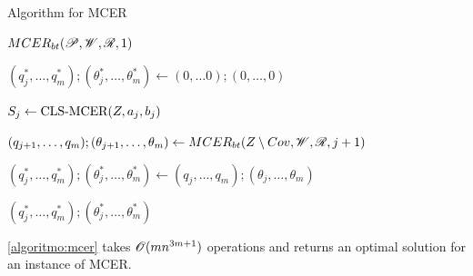\begin{algoritmo}
	\caption{Algorithm for MCER}\label{algoritmo:mcer}
	\begin{algorithmic}[1]
		
		
		\item[]
		\State \Return $MCER_{bt}(\mathscr{P}, \mathscr{W}, \mathscr{R}, 1)$
		\EndProcedure
		
		\item[]
		
		
		\State $(q_{j}^*, \dots, q_m^*); (\theta_{j}^*, \dots, \theta_m^*) \gets (0, \dots 0); (0, \dots, 0)$ 
		
		\State $S_j \gets \textnormal{CLS-MCER}(Z, a_j, b_j)$

		
		
		\State $(q_{j+1}, \dots, q_m); (\theta_{j+1}, \dots, \theta_m) \gets  MCER_{bt}(Z\setminus Cov, \mathscr{W}, \mathscr{R}, j+1)$
		\EndIf
		
			
			\State $(q_{j}^*, \dots, q_m^*); (\theta_{j}^*, \dots, \theta_m^*) \gets (q_{j}, \dots, q_m); (\theta_{j}, \dots, \theta_m)$
		\EndIf
		\EndFor
		
		\State \Return $(q_{j}^*, \dots, q_m^*); (\theta_{j}^*, \dots, \theta_m^*)$
		\EndProcedure
	\end{algorithmic}
\end{algoritmo}

\begin{corolario}
	\autoref{algoritmo:mcer} takes $\mathscr{O}(mn^{3m+1})$ operations and returns an optimal solution for an instance of MCER.
\end{corolario}

